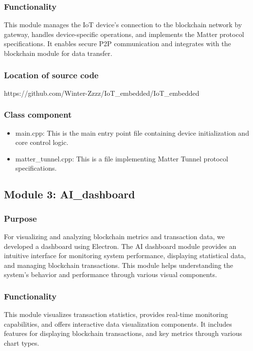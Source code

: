 \documentclass[conference]{IEEEtran}
\begin{document}
\subsubsection{Functionality}
This module manages the IoT device's connection to the blockchain network by gateway, handles device-specific operations, and implements the Matter protocol specifications. It enables secure P2P communication and integrates with the blockchain module for data transfer.

\subsubsection{Location of source code}
https://github.com/Winter-Zzzz/IoT\_embedded/IoT\_embedded

\subsubsection{Class component}
\begin{itemize}
	\item main.cpp: This is the main entry point file containing device initialization and core control logic.
	\item matter\_tunnel.cpp: This is a file implementing Matter Tunnel protocol specifications.
\end{itemize}

\subsection{Module 3: AI\_dashboard}

\subsubsection{Purpose}
For visualizing and analyzing blockchain metrics and transaction data, we developed a dashboard using Electron. The AI dashboard module provides an intuitive interface for monitoring system performance, displaying statistical data, and managing blockchain transactions. This module helps understanding the system's behavior and performance through various visual components.

\subsubsection{Functionality}
This module visualizes transaction statistics, provides real-time monitoring capabilities, and offers interactive data visualization components. It includes features for displaying blockchain transactions, and key metrics through various chart types.
\end{document}
